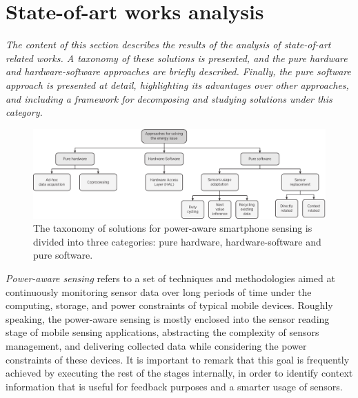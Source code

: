 \documentclass[ENG,PhD]{cinvestav}
\begin{document}
\section{State-of-art works analysis}
\label{sec:state-of-art}
\emph{The content of this section describes the results of the analysis of state-of-art related works. A taxonomy of these solutions is presented, and the pure hardware and hardware-software approaches are briefly described. Finally, the pure software approach is presented at detail, highlighting its advantages over other approaches, and including a framework for decomposing and studying solutions under this category.}


\begin{figure}[t]
  \centering
  \includegraphics[width=\textwidth]{approaches-taxonomy}
  \caption{The taxonomy of solutions for power-aware smartphone sensing is divided into three categories: pure hardware, hardware-software and pure software.}
  \label{fig:taxonomy-approaches}
\end{figure}

\emph{Power-aware sensing} refers to a set of techniques and methodologies aimed at continuously monitoring sensor data over long periods of time under the computing, storage, and power constraints of typical mobile devices.
Roughly speaking, the power-aware sensing is mostly enclosed into the sensor reading stage of mobile sensing applications, abstracting the complexity of sensors management, and delivering collected data while considering the power constraints of these devices. 
It is important to remark that this goal is frequently achieved by executing the rest of the stages internally, in order to identify context information that is useful for feedback purposes and a smarter usage of sensors.
\end{document}
